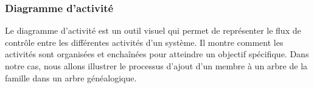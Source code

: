 \subsubsection{Diagramme d'activité}

Le diagramme d’activité est un outil visuel qui permet de représenter le flux
de contrôle entre les différentes activités d’un système. Il montre comment les
activités sont organisées et enchaînées pour atteindre un objectif spécifique.
Dans notre cas, nous allons illustrer le processus d’ajout d’un membre à un
arbre de la famille dans un arbre généalogique.



